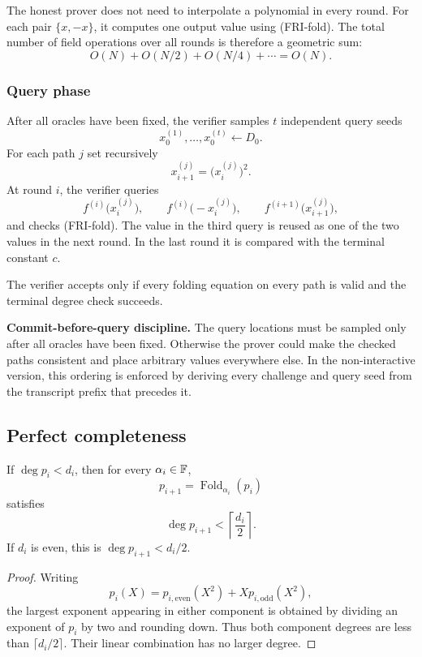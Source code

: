 The honest prover does not need to interpolate a polynomial in every round. For each pair
$\{x,-x\}$, it computes one output value using (FRI-fold). The total number of field
operations over all rounds is therefore a geometric sum:
\[
    O(N)+O(N/2)+O(N/4)+\cdots=O(N).
\]

\subsubsection*{Query phase}

After all oracles have been fixed, the verifier samples $t$ independent query seeds
\[
    x_0^{(1)},\ldots,x_0^{(t)}\leftarrow D_0.
\]
For each path $j$ set recursively
\[
    x_{i+1}^{(j)}=\bigl(x_i^{(j)}\bigr)^2.
\]
At round $i$, the verifier queries
\[
    f^{(i)}\bigl(x_i^{(j)}\bigr),
    \qquad
    f^{(i)}\bigl(-x_i^{(j)}\bigr),
    \qquad
    f^{(i+1)}\bigl(x_{i+1}^{(j)}\bigr),
\]
and checks (FRI-fold). The value in the third query is reused as one of the two values in the
next round. In the last round it is compared with the terminal constant $c$.

The verifier accepts only if every folding equation on every path is valid and the terminal
degree check succeeds.

\begin{tcolorbox}[colback=blue!4!white,colframe=blue!45!black]
\textbf{Commit-before-query discipline.} The query locations must be sampled only after all
oracles have been fixed. Otherwise the prover could make the checked paths consistent and
place arbitrary values everywhere else. In the non-interactive version, this ordering is
enforced by deriving every challenge and query seed from the transcript prefix that precedes
it.
\end{tcolorbox}

\subsection{Perfect completeness}

\begin{lemma}
If $\deg p_i<d_i$, then for every $\alpha_i\in\mathbb{F}$,
\[
    p_{i+1}=\operatorname{Fold}_{\alpha_i}(p_i)
\]
satisfies
\[
    \deg p_{i+1}<\left\lceil\frac{d_i}{2}\right\rceil.
\]
If $d_i$ is even, this is $\deg p_{i+1}<d_i/2$.
\end{lemma}

\begin{proof}
Writing
\[
    p_i(X)=p_{i,\mathrm{even}}(X^2)+X p_{i,\mathrm{odd}}(X^2),
\]
the largest exponent appearing in either component is obtained by dividing an exponent of
$p_i$ by two and rounding down. Thus both component degrees are less than
$\lceil d_i/2\rceil$. Their linear combination has no larger degree.
\end{proof}


